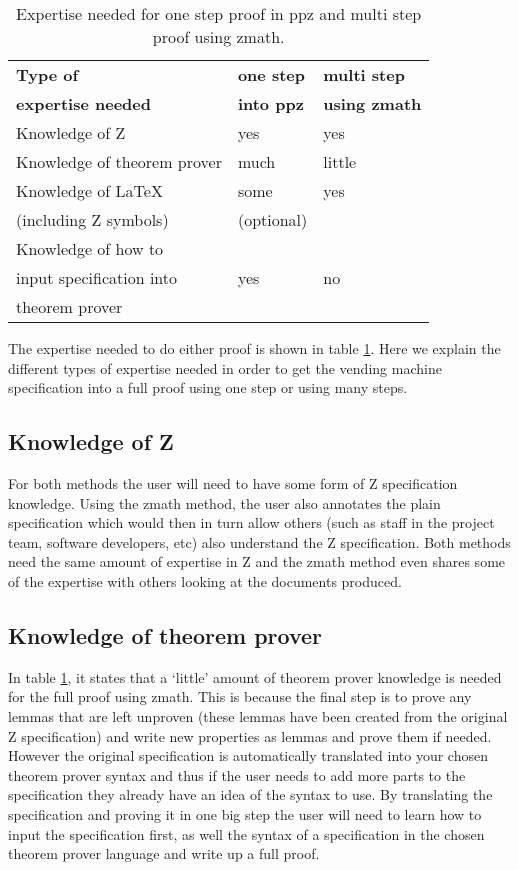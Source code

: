 \begin{table}[H]
\begin{center}
\begin{tabular}{| l | l | l |}
\hline
\textbf{Type of} & \textbf{one step} & \textbf{multi step} \\
\textbf{expertise needed} & \textbf{into \gls{ppz}} & \textbf{using \gls{zmath}}
\\
\hline
\hline
Knowledge of Z &  yes & yes \\
\hline
Knowledge of theorem prover & much & little \\
\hline
Knowledge of \LaTeX & some & yes \\
(including Z symbols) & (optional) & \\
\hline
Knowledge of how to & & \\
input specification into & yes & no \\
theorem prover & & \\
\hline
\end{tabular}
\end{center}
\caption{Expertise needed for one step proof in \gls{ppz} and multi step proof using \gls{zmath}.}
\label{tab:expertise}
\end{table}

The expertise needed to do either proof is shown in table \ref{tab:expertise}.
Here we explain the different types of expertise needed in order to get the
vending machine specification into a full proof using one step or using many
steps.

\subsection{Knowledge of Z}
For both methods the user will need to have some form of Z specification
knowledge. Using the \gls{zmath} method, the user also annotates the plain
specification which would then in turn allow others (such as staff in the
project team, software developers, etc) also understand the Z specification.
Both methods need the same amount of expertise in Z and the \gls{zmath} method
even shares some of the expertise with others looking at the documents produced.

\subsection{Knowledge of theorem prover}
In table \ref{tab:expertise}, it states that a `little' amount of theorem prover
knowledge is needed for the full proof using \gls{zmath}. This is because
the final step is to prove any lemmas that are left unproven (these lemmas have
been created from the original Z specification) and write new properties as
lemmas and prove them if needed. However the original specification is
automatically translated into your chosen theorem prover syntax and thus if the
user needs to add more parts to the specification they already have an idea of
the syntax to use. By translating the specification and proving it in one big
step the user will need to learn how to input the specification first, as well
the syntax of a specification in the chosen theorem prover language and write up
a full proof. 

